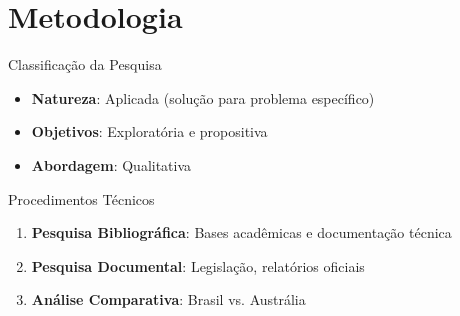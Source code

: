 \documentclass{libs/ufc_format}
\begin{document}

\section{Metodologia}
\begin{frame}{Classificação da Pesquisa}
    \begin{itemize}
        \item \textbf{Natureza}: Aplicada (solução para problema específico)
        \item \textbf{Objetivos}: Exploratória e propositiva
        \item \textbf{Abordagem}: Qualitativa
    \end{itemize}
    
    \vspace{0.3cm}
    
    \begin{block}{Procedimentos Técnicos}
        \begin{enumerate}
            \item \textbf{Pesquisa Bibliográfica}: Bases acadêmicas e documentação técnica
            \item \textbf{Pesquisa Documental}: Legislação, relatórios oficiais
            \item \textbf{Análise Comparativa}: Brasil vs. Austrália
        \end{enumerate}
    \end{block}
\end{frame}
\end{document}

